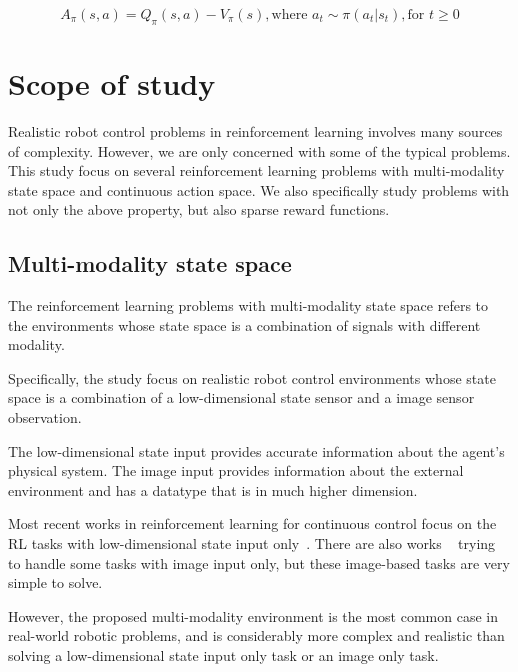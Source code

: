 $$ A_\pi (s,a) = Q_\pi (s,a) - V_\pi (s), \text{where } a_t \sim \pi (a_t|s_t), \text{for } t \geq 0 $$




\section{Scope of study}
Realistic robot control problems in reinforcement learning involves many sources of complexity. However, we are only concerned with some of the typical problems.
This study focus on several reinforcement learning problems with multi-modality state space and continuous action space. We also specifically study problems with not only the above property, but also sparse reward functions.

\subsection{Multi-modality state space}

The reinforcement learning problems with multi-modality state space refers to the environments whose state space is a combination of signals with different modality.

Specifically, the study focus on realistic robot control environments whose state space is a combination of a low-dimensional state sensor and a image sensor observation.

The low-dimensional state input provides accurate information about the agent's physical system. The image input provides information about the external environment and has a datatype that is in much higher dimension.

Most recent works in reinforcement learning for continuous control focus on the RL tasks with low-dimensional state input only~\cite{duan2016benchmarking}. There are also works ~\cite{wu2017scalable} trying to handle some tasks with image input only, but these image-based tasks are very simple to solve.

However, the proposed multi-modality environment is the most common case in real-world robotic problems, and is considerably more complex and realistic than solving a low-dimensional state input only task or an image only task.


